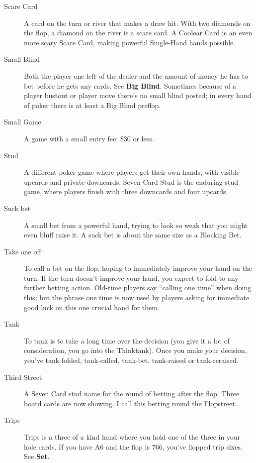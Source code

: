 \begin{description}
\item[Scare Card] A card on the turn or river that makes a draw hit.
With two diamonds on the flop, a diamond on the river is a scare card.
A Coolear Card is an even more scary Scare Card, making powerful
Single-Hand hands possible.

\item[Small Blind] Both the player one left of the dealer and the
amount of money he has to bet before he gets any cards. See
\textbf{Big Blind}. Sometimes because of a player bustout or player
move there's no small blind posted; in every hand of poker there is at
least a Big Blind preflop.

\item[Small Game] A game with a small entry fee; \$30 or less.

\item[Stud] A different poker game where players get their own hands,
with visible upcards and private downcards. Seven Card Stud is the
enduring stud game, where players finish with three downcards and four
upcards.

\item[Suck bet] A small bet from a powerful hand, trying to look so
weak that you might even bluff raise it. A suck bet is about the same
size as a Blocking Bet.

\item[Take one off] To call a bet on the flop, hoping to immediately
improve your hand on the turn. If the turn doesn't improve your hand,
you expect to fold to any further betting action. Old-time players say
``calling one time'' when doing this; but the phrase one time is now
used by players asking for immediate good luck on this one crucial
hand for them.

\item[Tank] To tank is to take a long time over the decision
(you give it a lot of consideration, you go into the Thinktank).
Once you make your decision, you've tank-folded, tank-called, tank-bet,
tank-raised or tank-reraised.

\item[Third Street] A Seven Card stud name for the round of betting
after the flop. Three board cards are now showing. I call this betting
round the Flopstreet.

\item[Trips] Trips is a three of a kind hand where you hold one of the
three in your hole cards. If you have A6 and the flop is 766, you've
flopped trip sixes. See \textbf{Set}.


\end{description}
